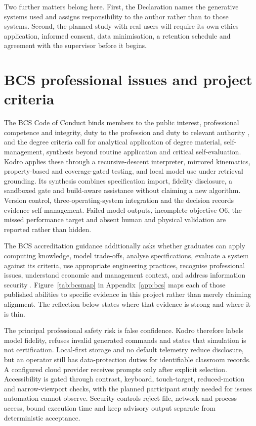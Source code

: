 \documentclass[11pt,a4paper]{report}
\begin{document}
Two further matters belong here. First, the Declaration names the generative systems used and assigns responsibility to the author rather than to those systems. Second, the planned study with real users will require its own ethics application, informed consent, data minimisation, a retention schedule and agreement with the supervisor before it begins.

\section{BCS professional issues and project criteria}
The BCS Code of Conduct binds members to the public interest, professional competence and integrity, duty to the profession and duty to relevant authority \citep{bcscode}, and the degree criteria call for analytical application of degree material, self-management, synthesis beyond routine application and critical self-evaluation. Kodro applies these through a recursive-descent interpreter, mirrored kinematics, property-based and coverage-gated testing, and local model use under retrieval grounding. Its synthesis combines specification import, fidelity disclosure, a sandboxed gate and build-aware assistance without claiming a new algorithm. Version control, three-operating-system integration and the decision records evidence self-management. Failed model outputs, incomplete objective O6, the missed performance target and absent human and physical validation are reported rather than hidden.

The BCS accreditation guidance additionally asks whether graduates can apply computing knowledge, model trade-offs, analyse specifications, evaluate a system against its criteria, use appropriate engineering practices, recognise professional issues, understand economic and management context, and address information security \citep{bcs2020}. Figure~\ref{tab:bcsmap} in Appendix~\ref{app:bcs} maps each of those published abilities to specific evidence in this project rather than merely claiming alignment. The reflection below states where that evidence is strong and where it is thin.

The principal professional safety risk is false confidence. Kodro therefore labels model fidelity, refuses invalid generated commands and states that simulation is not certification. Local-first storage and no default telemetry reduce disclosure, but an operator still has data-protection duties for identifiable classroom records. A configured cloud provider receives prompts only after explicit selection. Accessibility is gated through contrast, keyboard, touch-target, reduced-motion and narrow-viewport checks, with the planned participant study needed for issues automation cannot observe. Security controls reject file, network and process access, bound execution time and keep advisory output separate from deterministic acceptance.
\end{document}
